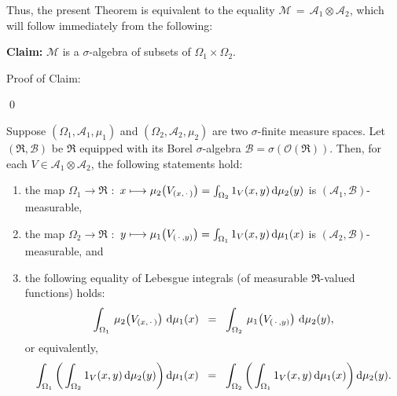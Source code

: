 \vskip 0.1cm
\noindent
Thus, the present Theorem is equivalent to the equality
$\mathcal{M} \,=\, \mathcal{A}_{1}\otimes\mathcal{A}_{2}$,
which will follow immediately from the following:

\vskip 0.5cm
\begin{center}
\begin{minipage}{6.5in}
\noindent
\textbf{Claim:}\quad
$\mathcal{M}$ is a $\sigma$-algebra of subsets of $\Omega_{1}\times\Omega_{2}$.
\end{minipage}
\end{center}

\vskip 0.3cm
\noindent
Proof of Claim:\quad

\qed

\begin{theorem}
\mbox{}\vskip0.1cm\noindent
Suppose
$\left(\Omega_{1},\mathcal{A}_{1},\mu_{1}\right)$ and $\left(\Omega_{2},\mathcal{A}_{2},\mu_{2}\right)$
are two $\sigma$-finite measure spaces.
Let $\left(\Re,\mathcal{B}\right)$ be $\Re$ equipped with its Borel $\sigma$-algebra
$\mathcal{B} = \sigma\!\left(\mathcal{O}(\Re)\right)$.
Then, for each $V \in \mathcal{A}_{1} \otimes \mathcal{A}_{2}$, the following statements hold:
\begin{enumerate}
\item	the map\;
		$\Omega_{1} \longrightarrow \Re$ $:$
		$x \longmapsto \mu_{2}\!\left(V_{(x,\,\cdot\,)}\right) = \int_{\Omega_{2}}1_{V}(x,y)\,\textnormal{d}\mu_{2}(y)$
		\;is $(\mathcal{A}_{1},\mathcal{B})$-measurable,
\item	the map\;
		$\Omega_{2} \longrightarrow \Re$ $:$
		$y \longmapsto \mu_{1}\!\left(V_{(\,\cdot\,,y)}\right) = \int_{\Omega_{1}}1_{V}(x,y)\,\textnormal{d}\mu_{1}(x)$
		\;is $(\mathcal{A}_{2},\mathcal{B})$-measurable, and
\item	the following equality of Lebesgue integrals (of measurable $\Re$-valued functions) holds:
		\begin{equation*}
		\int_{\Omega_{1}}\, \mu_{2}\!\left(V_{(x,\,\cdot\,)}\right) \,\textnormal{d}\mu_{1}(x)
		\;\; = \;\;
		\int_{\Omega_{2}}\, \mu_{1}\!\left(V_{(\,\cdot\,,y)}\right) \,\textnormal{d}\mu_{2}(y),
		\end{equation*}
		or equivalently,
		\begin{equation*}
		\int_{\Omega_{1}} \left(\, \int_{\Omega_{2}} 1_{V}(x,y) \,\textnormal{d}\mu_{2}(y) \right) \textnormal{d}\mu_{1}(x)
		\;\; = \;\;
		\int_{\Omega_{2}} \left(\, \int_{\Omega_{1}} 1_{V}(x,y) \,\textnormal{d}\mu_{1}(x) \right) \textnormal{d}\mu_{2}(y).
		\end{equation*}
\end{enumerate}
\end{theorem}
